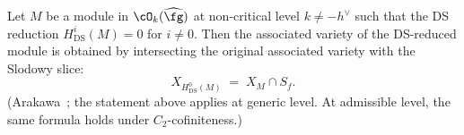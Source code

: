 \begin{theorem}
\label{thm:arakawa-variety-intersection}
Let $M$ be a module in $\cO_k(\widehat{\fg})$ at non-critical level
$k \neq -h^\vee$ such that the DS reduction
$H^i_{\mathrm{DS}}(M) = 0$ for $i \neq 0$.  Then the
associated variety of the DS-reduced module is obtained by
intersecting the original associated variety with the Slodowy slice:
\begin{equation}\label{eq:arakawa-variety-intersection}
X_{H^0_{\mathrm{DS}}(M)} \;=\; X_M \cap S_f.
\end{equation}
\textup{(}Arakawa~\textup{\cite{Ara15,ArakawaMoreau17}}\textup{;} the statement
above applies at generic level.  At admissible level, the same formula
holds under $C_2$-cofiniteness.\textup{)}
\end{theorem}

